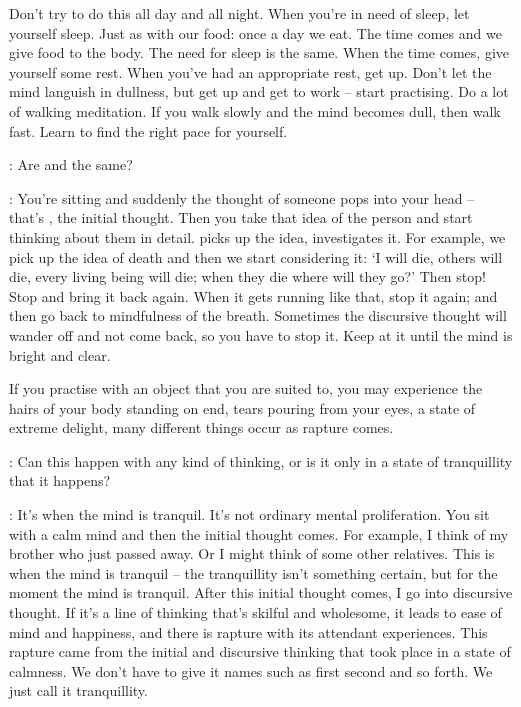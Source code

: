 Don't try to do this all day and all night. When you're in need of sleep, let yourself sleep. Just as with our food: once a day we eat. The time comes and we give food to the body. The need for sleep is the same. When the time comes, give yourself some rest. When you've had an appropriate rest, get up. Don't let the mind languish in dullness, but get up and get to work -- start practising. Do a lot of walking meditation. If you walk slowly and the mind becomes dull, then walk fast. Learn to find the right pace for yourself. 

: Are  and  the same? 

: You're sitting and suddenly the thought of someone pops into your head -- that's , the initial thought. Then you take that idea of the person and start thinking about them in detail.  picks up the idea,  investigates it. For example, we pick up the idea of death and then we start considering it: `I will die, others will die, every living being will die; when they die where will they go?' Then stop! Stop and bring it back again. When it gets running like that, stop it again; and then go back to mindfulness of the breath. Sometimes the discursive thought will wander off and not come back, so you have to stop it. Keep at it until the mind is bright and clear. 

If you practise  with an object that you are suited to, you may experience the hairs of your body standing on end, tears pouring from your eyes, a state of extreme delight, many different things occur as rapture comes. 

: Can this happen with any kind of thinking, or is it only in a state of tranquillity that it happens? 

: It's when the mind is tranquil. It's not ordinary mental proliferation. You sit with a calm mind and then the initial thought comes. For example, I think of my brother who just passed away. Or I might think of some other relatives. This is when the mind is tranquil -- the tranquillity isn't something certain, but for the moment the mind is tranquil. After this initial thought comes, I go into discursive thought. If it's a line of thinking that's skilful and wholesome, it leads to ease of mind and happiness, and there is rapture with its attendant experiences. This rapture came from the initial and discursive thinking that took place in a state of calmness. We don't have to give it names such as first  second  and so forth. We just call it tranquillity.

